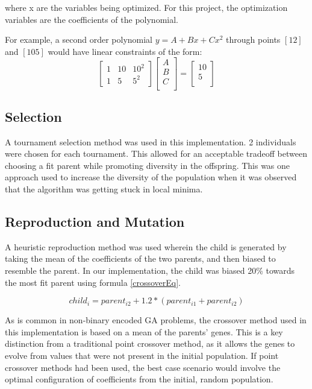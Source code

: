 where x are the variables being optimized. For this project, the optimization variables are the coefficients of the polynomial.

For example, a second order polynomial $y = A + Bx + Cx^2$ through points $[1 2]$ and $[10 5]$ would have linear constraints of the form:
\begin{equation} 
	\begin{bmatrix}
	1 & 10 & 10^2 \\
	1 & 5 & 5^2
	\end{bmatrix}
	\begin{bmatrix}
	A \\
	B \\
	C \\
	\end{bmatrix} = 
	\begin{bmatrix}
	10 \\
	5 \\
	\end{bmatrix}
\end{equation}
\subsection{Selection}
A tournament selection method was used in this implementation. 2 individuals were chosen for each tournament. This allowed for an acceptable tradeoff between choosing a fit parent while promoting diversity in the offspring. This was one approach used to increase the diversity of the population when it was observed that the algorithm was getting stuck in local minima.

\subsection{Reproduction and Mutation}
A heuristic reproduction method was used wherein the child is generated by taking the mean of the coefficients of the two parents, and then biased to resemble the parent. In our implementation, the child was biased 20\% towards the most fit parent using formula \ref{crossoverEq}.

\begin{equation} \label{crossoverEq}
	child_i = parent_{i2} + 1.2 * (parent_{i1} + parent_{i2})
\end{equation}

As is common in non-binary encoded GA problems, the crossover method used in this implementation is based on a mean of the parents' genes. This is a key distinction from a traditional point crossover method, as it allows the genes to evolve from values that were not present in the initial population. If point crossover methods had been used, the best case scenario would involve the optimal configuration of coefficients from the initial, random population.

